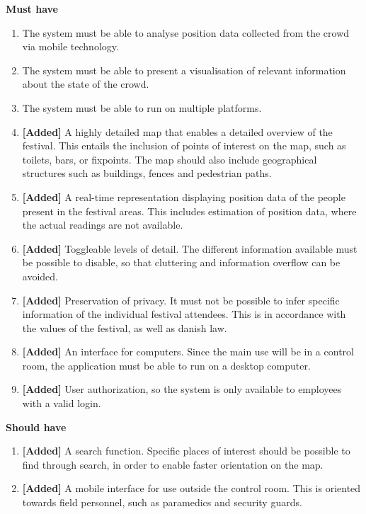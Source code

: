 


\textbf{Must have}
\begin{enumerate}
    \item The system must be able to analyse position data collected from the crowd via mobile technology.
    \item The system must be able to present a visualisation of relevant information about the state of the crowd.
    \item The system must be able to run on multiple platforms.
    \item \textbf{[Added]} A highly detailed map that enables a detailed overview of the festival. This entails the inclusion of points of interest on the map, such as toilets, bars, or fixpoints. The map should also include geographical structures such as buildings, fences and pedestrian paths.
    \item \textbf{[Added]} A real-time representation displaying position data of the people present in the festival areas. This includes estimation of position data, where the actual readings are not available.
    \item \textbf{[Added]} Toggleable levels of detail. The different information available must be possible to disable, so that cluttering and information overflow can be avoided.
    \item \textbf{[Added]} Preservation of privacy. It must not be possible to infer specific information of the individual festival attendees. This is in accordance with the values of the festival, as well as danish law.
    \item \label{itm:desktop_req} \textbf{[Added]} An interface for computers. Since the main use will be in a control room, the application must be able to run on a desktop computer.
    \item \textbf{[Added]} User authorization, so the system is only available to employees with a valid login.
\end{enumerate}

\textbf{Should have}
\begin{enumerate}[resume]
    \item \textbf{[Added]} A search function. Specific places of interest should be possible to find through search, in order to enable faster orientation on the map.
    \item \label{itm:mobile_req} \textbf{[Added]} A mobile interface for use outside the control room. This is oriented towards field personnel, such as paramedics and security guards.
\end{enumerate}

